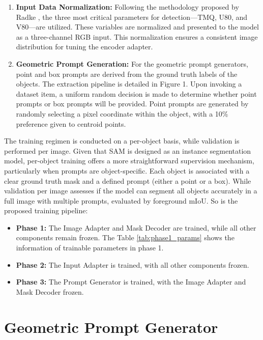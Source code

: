 \begin{enumerate}
    \item \textbf{Input Data Normalization:} Following the methodology proposed by Radke \cite{radke2024explaining}, the three most critical parameters for detection—TMQ, U80, and V80—are utilized. These variables are normalized and presented to the model as a three-channel RGB input. This normalization ensures a consistent image distribution for tuning the encoder adapter.
    
    \item \textbf{Geometric Prompt Generation:} For the geometric prompt generators, point and box prompts are derived from the ground truth labels of the objects. The extraction pipeline is detailed in Figure 1. Upon invoking a dataset item, a uniform random decision is made to determine whether point prompts or box prompts will be provided. Point prompts are generated by randomly selecting a pixel coordinate within the object, with a 10\% preference given to centroid points.
\end{enumerate}

The training regimen is conducted on a per-object basis, while validation is performed per image. Given that SAM is designed as an instance segmentation model, per-object training offers a more straightforward supervision mechanism, particularly when prompts are object-specific. Each object is associated with a clear ground truth mask and a defined prompt (either a point or a box). While validation per image assesses if the model can segment all objects accurately in a full image with multiple prompts, evaluated by foreground mIoU. So is the proposed training pipeline:
\begin{itemize}
    \item \textbf{Phase 1:} The Image Adapter and Mask Decoder are trained, while all other components remain frozen. The Table \ref{tab:phase1_params} shows the information of trainable parameters in phase 1.
    \item \textbf{Phase 2:} The Input Adapter is trained, with all other components frozen.
    \item \textbf{Phase 3:} The Prompt Generator is trained, with the Image Adapter and Mask Decoder frozen.
\end{itemize}

\section{Geometric Prompt Generator}


